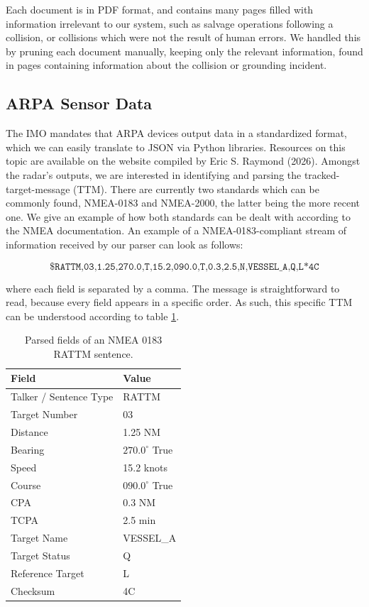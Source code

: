 \documentclass[10pt]{reportMaster}
\begin{document}
Each document is in PDF format, and contains many pages filled with information irrelevant to our system, such as salvage operations following a collision, or collisions which were not the result of human errors. We handled this by pruning each document manually, keeping only the relevant information, found in pages containing information about the collision or grounding incident.

\subsection{ARPA Sensor Data}

The IMO mandates that ARPA devices output data in a standardized format, which we can easily translate to JSON via Python libraries. Resources on this topic are available on the website compiled by Eric S. Raymond\cite{arpaguide} (2026). Amongst the radar's outputs, we are interested in identifying and parsing the tracked-target-message (TTM). There are currently two standards which can be commonly found, NMEA-0183 and NMEA-2000, the latter being the more recent one. We give an example of how both standards can be dealt with according to the NMEA documentation\cite{nmea}. An example of a NMEA-0183-compliant stream of information received by our parser can look as follows: 

\[
\texttt{\$RATTM,03,1.25,270.0,T,15.2,090.0,T,0.3,2.5,N,VESSEL\_A,Q,L*4C}
\]

where each field is separated by a comma. The message is straightforward to read, because every field appears in a specific order. As such, this specific TTM can be understood according to table \ref{tab:rattm-example}.

\begin{table}[htbp]
\centering
\label{tab:rattm-example}
\begin{tabular}{ll}
\hline
\textbf{Field} & \textbf{Value} \\
\hline
Talker / Sentence Type & RATTM \\
Target Number & 03 \\
Distance & 1.25 NM \\
Bearing & $270.0^\circ$ True \\
Speed & 15.2 knots \\
Course & $090.0^\circ$ True \\
CPA & 0.3 NM \\
TCPA & 2.5 min \\
Target Name & VESSEL\_A \\
Target Status & Q \\
Reference Target & L \\
Checksum & 4C \\
\hline
\end{tabular}
\caption{Parsed fields of an NMEA 0183 RATTM sentence.}
\end{table}
\end{document}
